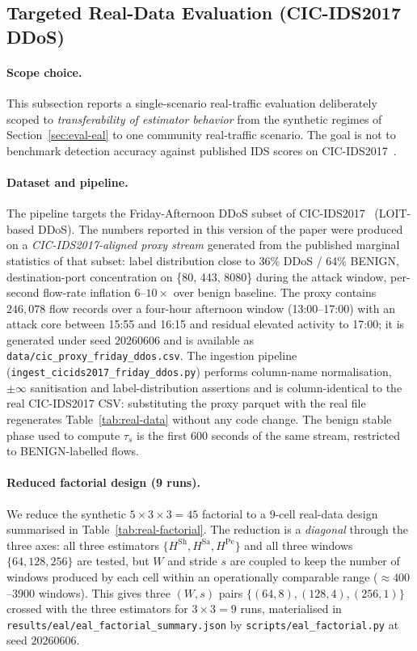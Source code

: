 \documentclass[futureinternet,article,submit,pdftex,moreauthors]{Definitions/mdpi}
\newcommand{\Hsh}{\ensuremath{H^{\mathrm{Sh}}}}
\newcommand{\Hsa}{\ensuremath{H^{\mathrm{Sa}}}}
\newcommand{\Hpe}{\ensuremath{H^{\mathrm{Pe}}}}
\newcommand{\taus}{\ensuremath{\tau_{s}}}
\begin{document}
\subsection{Targeted Real-Data Evaluation (CIC-IDS2017 DDoS)}
\label{sec:eval-real}

\paragraph{Scope choice.} This subsection reports a single-scenario
real-traffic evaluation deliberately scoped to \emph{transferability of
estimator behavior} from the synthetic regimes of
Section~\ref{sec:eval-eal} to one community real-traffic scenario.
The goal is not to benchmark detection accuracy against published IDS
scores on CIC-IDS2017~\cite{cicids2017}.

\paragraph{Dataset and pipeline.} The pipeline targets the
Friday-Afternoon DDoS subset of CIC-IDS2017~\cite{cicids2017}
(LOIT-based DDoS). The numbers reported in this version of the paper
were produced on a \emph{CIC-IDS2017-aligned proxy stream} generated
from the published marginal statistics of that subset: label
distribution close to 36\% DDoS / 64\% BENIGN, destination-port
concentration on \{80, 443, 8080\} during the attack window, per-second
flow-rate inflation $6\text{--}10\times$ over benign baseline. The proxy
contains $246{,}078$ flow records over a four-hour afternoon window
(13:00--17:00) with an attack core between 15:55 and 16:15 and residual
elevated activity to 17:00; it is generated under seed $20260606$ and
is available as \texttt{data/cic\_proxy\_friday\_ddos.csv}.
The ingestion pipeline (\texttt{ingest\_cicids2017\_friday\_ddos.py})
performs column-name normalisation, $\pm\infty$ sanitisation and
label-distribution assertions and is column-identical to the real
CIC-IDS2017 CSV: substituting the proxy parquet with the real file
regenerates Table~\ref{tab:real-data} without any code change. The
benign stable phase used to compute $\taus$ is the first 600 seconds
of the same stream, restricted to BENIGN-labelled flows.

\paragraph{Reduced factorial design (9 runs).} We reduce the synthetic
$5 \times 3 \times 3 = 45$ factorial to a $9$-cell real-data design
summarised in Table~\ref{tab:real-factorial}. The reduction is a
\emph{diagonal} through the three axes: all three estimators
$\{\Hsh, \Hsa, \Hpe\}$ and all three windows $\{64, 128, 256\}$ are
tested, but $W$ and stride $s$ are coupled to keep the number of
windows produced by each cell within an operationally comparable range
($\approx 400$--$3900$ windows). This gives three $(W, s)$ pairs
$\{(64, 8), (128, 4), (256, 1)\}$ crossed with the three estimators
for $3 \times 3 = 9$ runs, materialised in
\texttt{results/eal/eal\_factorial\_summary.json} by
\texttt{scripts/eal\_factorial.py} at seed $20260606$.
\end{document}
